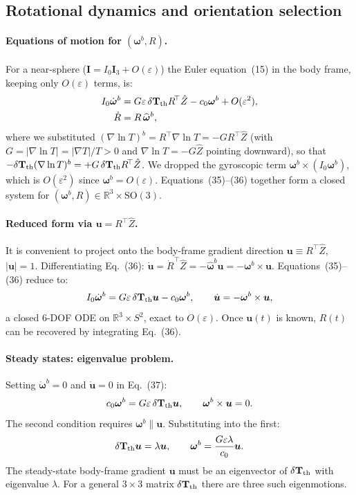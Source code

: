 \documentclass[11pt]{article}
\newcommand{\vect}[1]{\bm{#1}}
\newcommand{\T}{^{\!\top}}
\begin{document}
\subsection{Rotational dynamics and orientation selection}
\paragraph{Equations of motion for $(\vect\omega^b,R)$.} For a near-sphere ($\mathbf I=I_0\mathbf I_3+O(\varepsilon)$) the Euler equation~(15) in the body frame, keeping only $O(\varepsilon)$ terms, is:
\begin{align}
  I_0\dot{\vect\omega}^b &= G\varepsilon\,\delta\mathbf T_{\rm th}R\T\hat Z-c_0\vect\omega^b+O(\varepsilon^2),\\
  \dot R &= R\,\widehat{\vect\omega}^b,
\end{align}
where we substituted $(\nabla\ln T)^b=R\T\nabla\ln T=-GR\T\hat Z$ (with $G=|\nabla\ln T|=|\nabla T|/T>0$ and $\nabla\ln T=-G\hat Z$ pointing downward), so that $-\delta\mathbf T_{\rm th}(\nabla\ln T)^b=+G\,\delta\mathbf T_{\rm th}R\T\hat Z$. We dropped the gyroscopic term $\vect\omega^b\times(I_0\vect\omega^b)$, which is $O(\varepsilon^2)$ since $\vect\omega^b=O(\varepsilon)$. Equations~(35)--(36) together form a closed system for $(\vect\omega^b,R)\in\mathbb R^3\times\mathrm{SO}(3)$.

\paragraph{Reduced form via $\vect u=R\T\hat Z$.} It is convenient to project onto the body-frame gradient direction $\vect u\equiv R\T\hat Z$, $|\vect u|=1$. Differentiating Eq.~(36): $\dot{\vect u}=\dot R\T\hat Z=-\widehat{\vect\omega}^b\vect u=-\vect\omega^b\times\vect u$. Equations~(35)--(36) reduce to:
\begin{equation}
  I_0\dot{\vect\omega}^b=G\varepsilon\,\delta\mathbf T_{\rm th}\vect u-c_0\vect\omega^b,\qquad \dot{\vect u}=-\vect\omega^b\times\vect u,
\end{equation}
a closed 6-DOF ODE on $\mathbb R^3\times S^2$, exact to $O(\varepsilon)$. Once $\vect u(t)$ is known, $R(t)$ can be recovered by integrating Eq.~(36).

\paragraph{Steady states: eigenvalue problem.} Setting $\dot{\vect\omega}^b=0$ and $\dot{\vect u}=0$ in Eq.~(37):
\begin{equation}
  c_0\vect\omega^b=G\varepsilon\,\delta\mathbf T_{\rm th}\vect u,\qquad \vect\omega^b\times\vect u=0.
\end{equation}
The second condition requires $\vect\omega^b\parallel\vect u$. Substituting into the first:
\begin{equation}
  \delta\mathbf T_{\rm th}\vect u=\lambda\vect u,\qquad \vect\omega^b=\frac{G\varepsilon\lambda}{c_0}\vect u.
\end{equation}
The steady-state body-frame gradient $\vect u$ must be an eigenvector of $\delta\mathbf T_{\rm th}$ with eigenvalue $\lambda$. For a general $3\times3$ matrix $\delta\mathbf T_{\rm th}$ there are three such eigenmotions.
\end{document}
